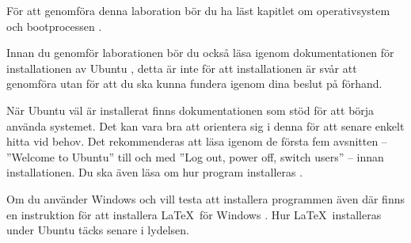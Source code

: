 För att genomföra denna laboration bör du ha läst kapitlet om operativsystem 
och bootprocessen \citep[kapitel 3]{Brookshear2012csa}.

Innan du genomför laborationen bör du också läsa igenom dokumentationen för 
installationen av Ubuntu \citep{UbuntuInstall}, detta är inte för att 
installationen är svår att genomföra utan för att du ska kunna fundera igenom 
dina beslut på förhand.

När Ubuntu väl är installerat finns dokumentationen \citep{UbuntuDesktop} som 
stöd för att börja använda systemet.
Det kan vara bra att orientera sig i denna för att senare enkelt hitta vid 
behov.
Det rekommenderas att läsa igenom de första fem avsnitten -- ''Welcome to 
Ubuntu'' till och med ''Log out, power off, switch users'' -- innan 
installationen.
Du ska även läsa om hur program installeras \citep[se Install additional 
software]{UbuntuDesktop}.

Om du använder Windows och vill testa att installera programmen även där finns 
en instruktion för att installera \LaTeX\ för Windows \citep{Bosk2012lui}.
Hur \LaTeX\ installeras under Ubuntu täcks senare i lydelsen.
